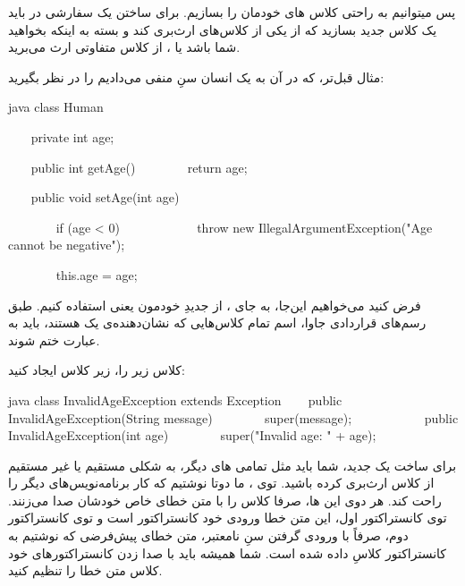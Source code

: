 پس میتوانیم به راحتی کلاس های  خودمان را بسازیم.
برای ساختن یک  سفارشی  در
 باید یک کلاس جدید بسازید که از یکی از کلاس‌های
 ارث‌بری کند و بسته به اینکه بخواهید
 شما  باشد یا  ، از کلاس متفاوتی
ارث می‌برید.

مثال قبل‌تر، که در آن به یک انسان سنِ منفی می‌دادیم را در نظر بگیرید:

\begin{codebox}{java}
class Human {
    private int age;

    public int getAge() {
        return age;  
    }

    public void setAge(int age) {
        if (age < 0) {
            throw new IllegalArgumentException("Age cannot be negative");  
        }

        this.age = age;  
    }  
}
\end{codebox}

فرض کنید می‌خواهیم این‌جا، به جای  ،
از  جدیدِ خودمون یعنی
 استفاده کنیم. طبق رسم‌های قراردادی
جاوا، اسم تمام کلاس‌هایی که نشان‌دهنده‌ی یک  هستند،
باید به عبارت  ختم شوند.

کلاس زیر را، زیر کلاس  ایجاد کنید:

\begin{codebox}{java}
class InvalidAgeException extends Exception {
    public InvalidAgeException(String message) {
        super(message);  
    }
    
    public InvalidAgeException(int age) {
        super("Invalid age: " + age);  
    }  
}
\end{codebox}

برای ساخت یک  جدید، شما باید مثل تمامی
 های دیگر، به شکلی مستقیم یا غیر مستقیم از کلاس
 ارث‌بری کرده باشید. توی
 ، ما دوتا  نوشتیم که
کار برنامه‌نویس‌های دیگر را راحت کند. هر دوی این  ها، صرفا
 کلاس  را با متن خطای خاص خودشان
صدا می‌زنند. توی کانستراکتور اول، این متن خطا ورودی خود کانستراکتور است و
توی کانستراکتور دوم، صرفاً با ورودی گرفتن سنِ نامعتبر، متن خطای پیش‌فرضی که
نوشتیم به کانستراکتور کلاسِ  داده شده است. شما
همیشه باید با صدا زدن کانستراکتورهای خود کلاس 
متن خطا را تنظیم کنید.

